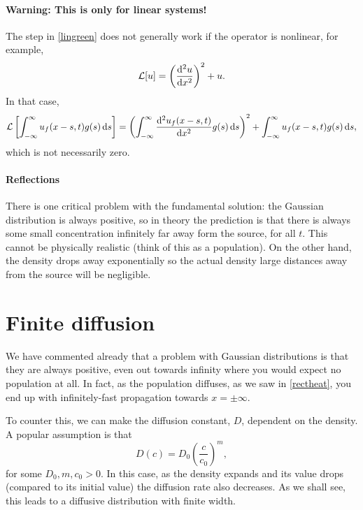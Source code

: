 \documentclass[main.tex]{subfiles}
\begin{document}
\paragraph{Warning: This is only for linear systems!}
The step in \cref{lingreen} does not generally work if the operator is nonlinear, for example,
\begin{equation}
\Lin[u] = \left(\fdd{u}{x}\right)^2 + u.
\end{equation}
In that case,
\begin{equation}
\Lin\left[\int_{-\infty}^{\infty} u_f(x-s,t)g(s)\,\d s\right] = \left(\int_{-\infty}^{\infty} \fdd{u_f(x-s,t)}{x} g(s)\,\d s\right)^2 +\int_{-\infty}^{\infty} u_f(x-s,t)g(s)\,\d s,
\end{equation}
which is not necessarily zero.


\paragraph{Reflections}
There is one critical problem with the fundamental solution: the Gaussian distribution is always positive, so in theory the prediction is that there is always some small concentration infinitely far away form the source, for all $t$. This cannot be physically realistic (think of this as a population). On the other hand, the density drops away exponentially so the actual density large distances away from the source will be negligible. 



\section{Finite diffusion}
\label{chap:finite-diffusion}
We have commented already that a problem with Gaussian distributions is that they are always positive, even out towards infinity where you would expect no population at all. In fact, as the population diffuses, as we saw in \cref{rectheat}, you end up with infinitely-fast propagation towards $x=\pm\infty$. 

To counter this, we can make the diffusion constant, $D$, dependent on the density. A popular assumption is that 
\begin{equation}
D(c) = D_0\left(\frac{c}{c_0}\right)^m,
\end{equation}
for some $D_0, m, c_0>0$. In this case, as the density expands and its value drops (compared to its initial value) the diffusion rate also decreases. As we shall see, this leads to a diffusive distribution with finite width. 
\end{document}
